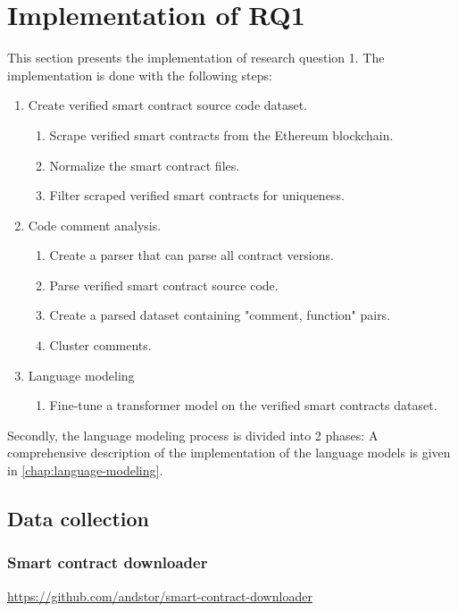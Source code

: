 \section{Implementation of RQ1}
This section presents the implementation of research question 1. The implementation is done with the following steps:
\begin{enumerate}
    \item Create verified smart contract source code dataset.
    \begin{enumerate}
        \item Scrape verified smart contracts from the Ethereum blockchain.
        \item Normalize the smart contract files.
        \item Filter scraped verified smart contracts for uniqueness.
    \end{enumerate}
    \item Code comment analysis.
    \begin{enumerate}
        \item Create a parser that can parse all contract versions.
        \item Parse verified smart contract source code.
        \item Create a parsed dataset containing "comment, function" pairs.
        \item Cluster comments.
    \end{enumerate}
    \item Language modeling
    \begin{enumerate}
        \item Fine-tune a transformer model on the verified smart contracts dataset.
    \end{enumerate}
\end{enumerate}

Secondly, the language modeling process is divided into 2 phases:
A comprehensive description of the implementation of the language models is given in \cref{chap:language-modeling}.

\subsection{Data collection}
\label{sec:data-collection}

\subsubsection{Smart contract downloader}
\label{sec:smart-contract-downloader}
\url{https://github.com/andstor/smart-contract-downloader}


